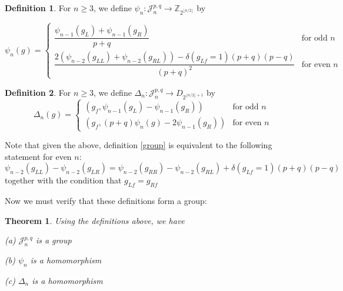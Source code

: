 \documentclass[11pt]{article}
\theoremstyle{plain}
\newtheorem{theorem}{Theorem}
\theoremstyle{definition}
\newtheorem{definition}{Definition}
\begin{document}
\begin{definition}
    For $n \geq 3$, we define $\psi_n:\mathcal{J}_n^{p,q} \rightarrow \mathbb{Z}_{2^{\lfloor n/2 \rfloor}}$ 
    by 
    
    $$\psi_n(g) = \begin{cases}

    \dfrac{\psi_{n-1}(g_L) + \psi_{n-1}(g_R)}{p+q} & \text{for odd $n$}\\
    
    \dfrac{2(\psi_{n-2}(g_{LL}) + \psi_{n-2}(g_{RL})) - \delta(g_{Lf}=1)(p+q)(p-q)}{(p+q)^2} & \text{for even $n$}
    
    
    \end{cases}
    $$
\end{definition}

\begin{definition}
    For $n \geq 3$, we define $\Delta_n:\mathcal{J}_n^{p,q} \rightarrow D_{2^{\lfloor n/2 \rfloor+1}}$ by 
    $$ \Delta_n(g) = \begin{cases} 

     (g_f, \psi_{n-1}(g_L) - \psi_{n-1}(g_R))& \text{for odd $n$} \\
    (g_f, (p+q)\psi_n(g) - 2\psi_{n-1}(g_R)) & \text{for even $n$}
    
    \end{cases}$$
\end{definition}

Note that given the above, definition \ref{group} is equivalent to the following statement for even $n$:
\begin{equation}\label{defin}
    \psi_{n-2}(g_{LL}) - \psi_{n-2}(g_{LR}) = \psi_{n-2}(g_{RR}) - \psi_{n-2}(g_{RL}) + \delta(g_{Lf}=1)(p+q)(p-q)
\end{equation}
together with the condition that $g_{Lf} = g_{Rf}$


Now we must verify that these definitions form a group:

\begin{theorem}
    Using the definitions above, we have
    
    (a) $\mathcal{J}_n ^{p,q}$ is a group
    
    (b) $\psi_n$ is a homomorphism
    
    
    (c) $\Delta_n$ is a homomorphism
    
    
\end{theorem}
\end{document}
